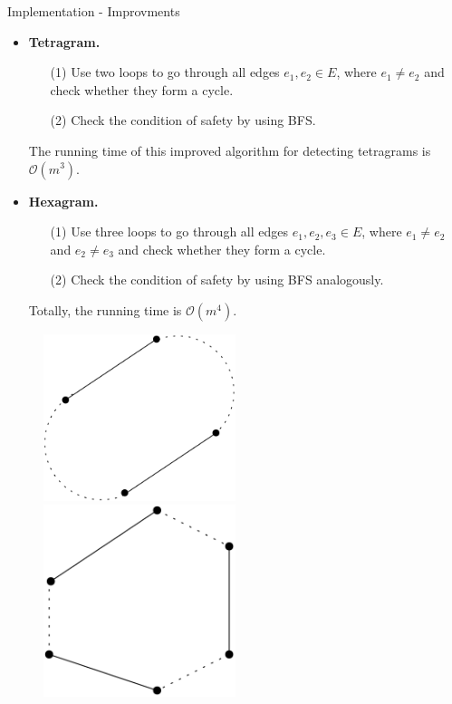 \documentclass{beamer}
\begin{document}
\begin{frame}{Implementation - Improvments}
    \begin{itemize}
    \item \textbf{Tetragram.} 
\begin{itemize}
    \item[(1)] Use two loops to go through all edges $e_1, e_2 \in E$, where $e_1 \ne e_2$ and check whether they form a cycle.
    \item[(2)] Check the condition of safety by using BFS.
\end{itemize}
     The running time of this improved algorithm for detecting tetragrams is $\mathcal{O}(m^3)$.

     \item \textbf{Hexagram.} 
     \begin{itemize}
         \item[(1)]  Use three loops to go through all edges $e_1, e_2, e_3 \in E$, where $e_1 \ne e_2$ and $e_2 \ne e_3$ and check whether they form a cycle.
         \item[(2)] Check the condition of safety by using BFS analogously.
     \end{itemize}
    Totally, the running time is $\mathcal{O}(m^4)$.
\end{itemize}
\begin{figure}[htbp]
    \centering
    \begin{minipage}[t]{0.48\textwidth}
    \centering
    \includegraphics[width=0.5\textwidth]{figure/improve1.png}
    \end{minipage}
    \begin{minipage}[t]{0.48\textwidth}
    \centering
    \includegraphics[width=0.5\textwidth]{figure/improve2.png}
    \end{minipage}
    \end{figure}
\end{frame}
\end{document}
